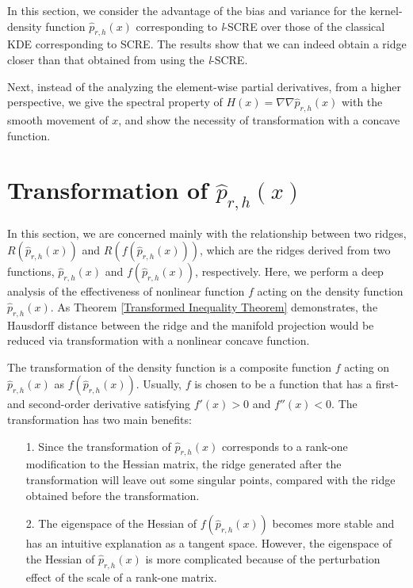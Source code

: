 \documentclass[aos,preprint]{imsart}
\theoremstyle{remark}
\begin{document}
In this section, we consider the advantage of the bias and variance for the kernel-density function $\hat{p}_{r,h}(x)$ corresponding to {\it l}-SCRE over those of the classical KDE corresponding to SCRE. The results show that we can indeed obtain a ridge closer than that obtained from using the {\it l}-SCRE.

Next, instead of the analyzing the element-wise partial derivatives, from a higher perspective, we give the spectral property of $H(x) = \nabla\nabla \hat{p}_{r,h}(x)$ with the smooth movement of $x$, and show the necessity of transformation with a concave function.
\section{Transformation of $\hat{p}_{r,h}(x)$}
In this section, we are concerned mainly with the relationship between two ridges, $R({\hat{p}_{r,h}(x)})$ and $R({f({\hat{p}_{r,h}(x)})})$, which are the ridges derived from two functions, $\hat{p}_{r,h}(x)$ and  $f( \hat{p}_{r,h}(x))$, respectively. Here, we perform a deep analysis of the effectiveness of nonlinear function $f$ acting on the density function $\hat{p}_{r,h}(x)$. As Theorem \ref{Transformed Inequality Theorem} demonstrates, the Hausdorff distance between the ridge and the manifold projection would be reduced via transformation with a nonlinear concave function.

The transformation of the density function is a composite function $f$ acting on $\hat{p}_{r,h}(x)$ as $f( \hat{p}_{r,h}(x))$. Usually, $f$ is chosen to be a function that has a first- and second-order derivative satisfying $f'(x)>0$ and $f''(x)<0$. The transformation has two main benefits:
\begin{itemize}
\item[1.] Since the transformation of $\hat{p}_{r,h}(x)$ corresponds to a rank-one modification to the Hessian matrix, the ridge generated after the transformation will leave out some singular points, compared with the ridge obtained before the transformation.
\item[2.] The eigenspace of the Hessian of $f( \hat{p}_{r,h}(x))$ becomes more stable and has an intuitive explanation as a tangent space. However, the eigenspace of the Hessian of $\hat{p}_{r,h}(x)$ is more complicated because of the perturbation effect of the scale of a rank-one matrix.
\end{itemize}
\end{document}
